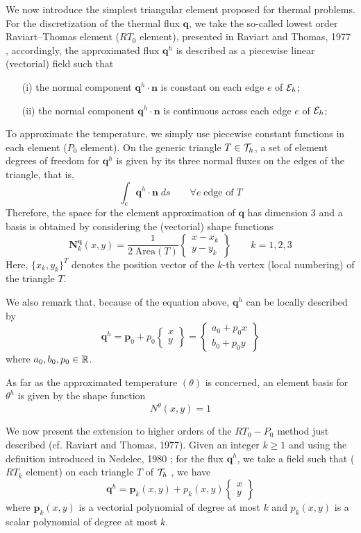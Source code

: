 \begin{itemize}
\begin{displayquote}
{We now introduce the simplest
triangular element proposed for thermal problems.
For the discretization of the thermal flux ${\bm q}$, we take
the so-called lowest order Raviart–Thomas element
($RT_0$ element), presented in Raviart and Thomas, 1977 \cite{rath77},
accordingly, the approximated flux ${\bm q}^h$ is described as a
piecewise linear (vectorial) field such that
\begin{itemize}
\item[(i)] the normal component ${\bm q}^h\cdot {\bm n}$ is constant on each
edge $e$ of ${\cal E}_h$;
\item[(ii)] the normal component ${\bm q}^h\cdot {\bm n}$ is continuous across each
edge $e$ of ${\cal E}_h$;
\end{itemize}
To approximate the temperature, we simply use piecewise constant 
functions in each element ($P_0$ element).
On the generic triangle $T\in {\cal T}_h$, a set of element degrees
of freedom for ${\bm q}^h$ is given by its three normal fluxes on
the edges of the triangle, that is,
\[
\int_e {\bm q}^h \cdot {\bm n} \; ds \qquad \forall e\; \text{edge of}\; T
\]
Therefore, the space for the element approximation of ${\bm q}$
has dimension 3 and a basis is obtained by considering
the (vectorial) shape functions
\[
{\bm N}^{\bm q}_k(x,y) = \frac{1}{2  \; \text{Area}(T)} 
\left\{
\begin{array}{c}
x-x_k \\ y-y_k
\end{array}
\right\}
\qquad k=1,2,3
\]
Here, $\{x_k , y_k \}^T$ denotes the position vector of the $k$-th
vertex (local numbering) of the triangle $T$.

We also remark that, because of the equation above, ${\bm q}^h$ can be locally
described by
\[
{\bm q}^h = {\bm p}_0 + p_0 
\left\{
\begin{array}{c}
x \\y
\end{array}
\right\}
=
\left\{
\begin{array}{c}
a_0+p_0 x \\ b_0 + p_0 y
\end{array}
\right\}
\]
where $a_0,b_0,p_0 \in {\mathbb{R}}$.

As far as the approximated temperature $(\theta)$ is concerned, an
element basis for $\theta^h$ is given by the shape function
\[
N^\theta (x,y)=1
\]

We now present the extension to
higher orders of the $RT_0-P_0$ method just described (cf.
Raviart and Thomas, 1977). Given an integer $k \ge 1$ and
using the definition introduced in Nedelec, 1980 \cite{nede80}; for the
flux ${\bm q}^h$, we take a field such that ($RT_k$ element) on each
triangle $T$ of ${\cal T}_h$ , we have
\[
{\bm q}^h = {\bm p}_k(x,y) + p_k(x,y)
\left\{
\begin{array}{c}
x \\ y
\end{array}
\right\}
\]
where 
${\bm p}_k(x,y)$ is a vectorial polynomial of degree at most $k$ and 
${p}_k(x,y)$ is a scalar polynomial of degree at most $k$.

}
\end{displayquote}
\end{itemize}
